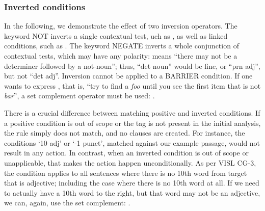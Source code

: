 \subsubsection{Inverted conditions}

In the following, we demonstrate the effect of two inversion operators. 
The keyword NOT inverts a single contextual test, uch as , as well as linked conditions, such as . The keyword NEGATE inverts a whole conjunction of contextual tests, which may have any polarity:  means ``there may not be a determiner followed by a not-noun''; thus, ``det noun'' would be fine, or ``prn adj'', but not ``det adj''. %
Inversion cannot be applied to a BARRIER condition. If one wants to express , that is, ``try to find a \emph{foo} until you see the first item that is not \emph{bar}'', a set complement operator must be used: .

There is a crucial difference between matching positive and inverted conditions.
If a positive condition is out of scope or the tag is not present in the initial analysis, the rule simply does not match, and no clauses are created. For instance, the conditions `10 adj' or `-1 punct', matched against our example passage, would not result in any action.
In contrast, when an inverted condition is out of scope or unapplicable, 
that makes the action happen unconditionally.
As per VISL CG-3, the condition  applies to all sentences where there is no 10th word from target that is adjective; including the case where there is no 10th word at all.
If we need to actually have a 10th word to the right, but that word may not be an adjective, we can, again, use the set complement: .





